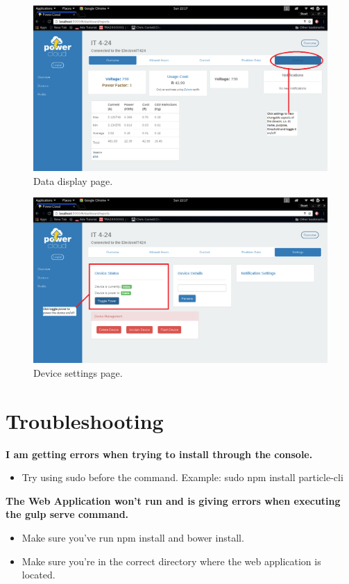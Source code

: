 \documentclass[a4paper,10pt]{article}
\begin{document}
	\begin{figure}[H]
		\includegraphics[width=\textwidth]{images/settings1.png}
		\caption{Data display page. \label{overflow}}
	\end{figure}
	
	\begin{figure}[H]
		\includegraphics[width=\textwidth]{images/settings.png}
		\caption{Device settings page. \label{overflow}}
	\end{figure}
	
	\newpage
	\section{Troubleshooting}
	\textbf{I am getting errors when trying to install through the console.}
	\begin{itemize}
		\item Try using sudo before the command. Example: sudo npm install particle-cli
	\end{itemize}
	
	\textbf{The Web Application won't run and is giving errors when executing the gulp serve command.} 
	\begin{itemize}
		\item Make sure you've run npm install and bower install.
		\item Make sure you're in the correct directory where the web application is located.
	\end{itemize}
\end{document}
